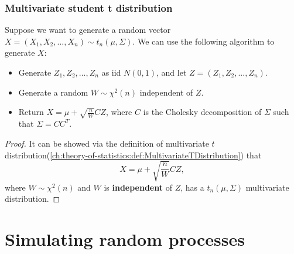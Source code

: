 \begin{refsection}
\subsubsection{Multivariate student t distribution}
\begin{lemma}\label{ch:MonteCarlo-methods--optimization:th:generateMultivariateStudentTRandomVector}
	Suppose we want to generate a random vector $X=(X_1,X_2,...,X_n)\sim t_n(\mu, \Sigma)$. We can use the following algorithm to generate $X$:
	\begin{itemize}
		\item Generate $Z_1,Z_2,...,Z_n$ as iid $N(0,1)$, and let $Z = (Z_1,Z_2,...,Z_n).$
		\item Generate a random $W\sim \chi^2(n)$ independent of $Z$.
		\item Return $X= \mu + \sqrt{\frac{n}{W}}CZ$, where $C$ is the Cholesky decomposition of $\Sigma$ such that $\Sigma = CC^T$.
	\end{itemize}	
\end{lemma}
\begin{proof}
	It can be showed via the definition of multivariate $t$ distribution(\autoref{ch:theory-of-statistics:def:MultivariateTDistribution}) that
$$X = \mu + \sqrt{\frac{n}{W}}CZ,$$
where $W\sim \chi^2(n)$ and $W$ is \textbf{independent} of $Z$,
has a $t_n(\mu,\Sigma)$ multivariate distribution.
\end{proof}


\section{Simulating random processes}


\end{refsection}
